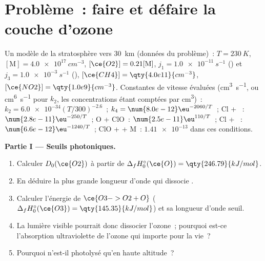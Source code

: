 \section{Problème~: faire et défaire la couche d'ozone}

\begin{problem}
\label{pb:b3:photochemistry:1}
Un modèle de la stratosphère vers \qty{30}{km} (données du problème)~:
$T = \qty{230}{K}$, $[\mathrm M] =
\qty{4.0e17}{cm^{-3}}$, $[\ce{O2}] = 0.21[\mathrm M]$,  $j_1 = \qty{1.0e-11}{s^{-1}}$ ()
et $j_3 = \qty{1.0e-3}{s^{-1}}$ (), $[\ce{CH4}] = \qty{4.0e11}{cm^{-3}}$, $[\ce{NO2}] = \qty{1.0e9}{cm^{-3}}$.
Constantes de vitesse évaluées (\unit{cm^3.s^{-1}}, ou \unit{cm^6.s^{-1}}
pour $k_2$, les concentrations étant comptées par \unit{cm^3})~:
$k_2 = \num{6.0e-34}(T/300)^{-2.6}$~; $k_4 = \num{8.0e-12}\eu^{-2060/T}$~; Cl + ~: $\num{2.8e-11}\eu^{-250/T}$~;
O + ClO~: $\num{2.5e-11}\eu^{110/T}$~; Cl + ~: $\num{6.6e-12}\eu^{-1240/T}$~; ClO +  + M~: $\num{1.41e-13}$ dans
ces conditions.

\medskip\noindent\textbf{Partie I --- Seuils photoniques.}
\begin{enumerate}
  \item Calculer $D_0(\ce{O2})$ à partir de $\Delta_fH^\circ_0(\ce{O}) = \qty{246.79}{kJ/mol}$.
  \item En déduire la plus grande longueur d'onde qui dissocie .
  \item Calculer l'énergie de $\ce{O3 -> O2 + O}$
        ($\Delta_fH^\circ_0(\ce{O3}) = \qty{145.35}{kJ/mol}$) et sa
        longueur d'onde seuil.
  \item La lumière visible pourrait donc dissocier l'ozone~; pourquoi
        est-ce l'absorption ultraviolette de l'ozone qui importe pour la
        vie~?
  \item Pourquoi  n'est-il photolysé qu'en haute altitude~?
\end{enumerate}


\end{problem}
